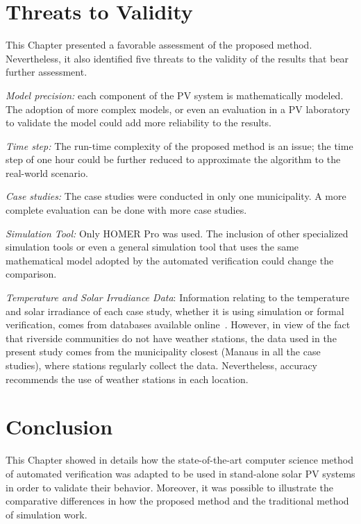 \section{Threats to Validity}

This Chapter presented a favorable assessment of the proposed method. %
Nevertheless, it also identified five threats to the validity of the results that bear further assessment.

\textit{Model precision:} each component of the PV system is mathematically modeled. %
The adoption of more complex models, or even an evaluation in a PV laboratory to validate the model could add more reliability to the results.

\textit{Time step:} The run-time complexity of the proposed method is an issue; the time step of one hour could be further reduced to approximate the algorithm to the real-world scenario.

\textit{Case studies:} The case studies were conducted in only  one municipality. A more complete evaluation can be done with more case studies.

\textit{Simulation Tool:} Only HOMER Pro was used. The inclusion of other specialized simulation tools or even a general simulation tool that uses the same mathematical model adopted by the automated verification could change the comparison.

\textit{Temperature and Solar Irradiance Data}: Information relating to the temperature and solar irradiance of each case study, whether it is using simulation or formal verification, comes from databases available online~\cite{Temperature, Irradiance}. However, in view of the fact that riverside communities do not have weather stations, the data used in the present study comes from the municipality closest (Manaus in all the case studies), where stations regularly collect the data. Nevertheless, accuracy recommends the use of weather stations in each location.

\section{Conclusion}

This Chapter showed in details how the state-of-the-art computer science method of automated verification was adapted to be used in stand-alone solar PV systems in order to validate their behavior. Moreover, it was possible to illustrate the comparative differences in how the proposed method and the traditional method of simulation work.

